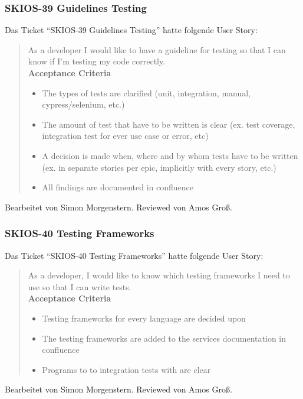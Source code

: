 \subsubsection{SKIOS-39 Guidelines Testing}
Das Ticket \enquote{SKIOS-39 Guidelines Testing} hatte folgende User Story:
\begin{quotation}
    As a developer I would like to have a guideline for testing so that I can know if I'm testing my code correctly. \\
\textbf{Acceptance Criteria}
\begin{itemize}
    \item The types of tests are clarified (unit, integration, manual, cypress/selenium, etc.)
    \item The amount of test that have to be written is clear (ex. test coverage, integration test for ever use case or error, etc)
    \item A decision is made when, where and by whom tests have to be written (ex. in separate stories per epic, implicitly with every story, etc.)
    \item All findings are documented in confluence
\end{itemize}
\end{quotation}
Bearbeitet von Simon Morgenstern.
Reviewed von Amos Groß.

\subsubsection{SKIOS-40 Testing Frameworks}
Das Ticket \enquote{SKIOS-40 Testing Frameworks} hatte folgende User Story:
\begin{quotation}
    As a developer, I would like to know which testing frameworks I need to use so that I can write tests. \\
\textbf{Acceptance Criteria}
\begin{itemize}
    \item Testing frameworks for every language are decided upon
    \item The testing frameworks are added to the services documentation in confluence
    \item Programs to to integration tests with are clear
\end{itemize}
\end{quotation}
Bearbeitet von Simon Morgenstern.
Reviewed von Amos Groß.

